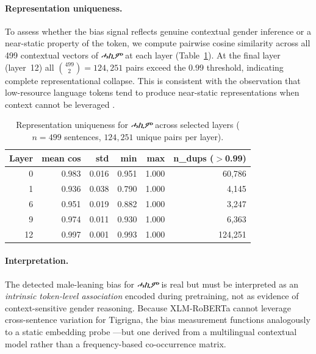 \documentclass[10pt]{article}
\begin{document}
\paragraph{Representation uniqueness.}
To assess whether the bias signal reflects genuine contextual gender inference
or a near-static property of the token, we compute pairwise cosine similarity
across all 499 contextual vectors of \textit{ሓኪም} at each layer
(Table~\ref{tab:hakim-uniqueness}). At the final layer (layer~12) all
$\binom{499}{2} = 124{,}251$ pairs exceed the $0.99$ threshold, indicating
complete representational collapse. This is consistent with the observation
that low-resource language tokens tend to produce near-static representations
when context cannot be leveraged \citep{bommasani2020reductions}.

\begin{table}[H]
\centering
\caption{Representation uniqueness for \textit{ሓኪም} across selected layers
         ($n = 499$ sentences, $124{,}251$ unique pairs per layer).}
\label{tab:hakim-uniqueness}
\small
\begin{tabular}{rrrrrr}
\toprule
\textbf{Layer} & \textbf{mean cos} & \textbf{std} & \textbf{min} & \textbf{max} & \textbf{n\_dups ($>$0.99)} \\
\midrule
 0 & 0.983 & 0.016 & 0.951 & 1.000 &  60{,}786 \\
 1 & 0.936 & 0.038 & 0.790 & 1.000 &   4{,}145 \\
 6 & 0.951 & 0.019 & 0.882 & 1.000 &   3{,}247 \\
 9 & 0.974 & 0.011 & 0.930 & 1.000 &   6{,}363 \\
12 & 0.997 & 0.001 & 0.993 & 1.000 & 124{,}251 \\
\bottomrule
\end{tabular}
\end{table}

\paragraph{Interpretation.}
The detected male-leaning bias for \textit{ሓኪም} is real but must be
interpreted as an \emph{intrinsic token-level association} encoded during
pretraining, not as evidence of context-sensitive gender reasoning. Because
XLM-RoBERTa cannot leverage cross-sentence variation for Tigrigna, the bias
measurement functions analogously to a static embedding probe
\citep{caliskan2017semantics}---but one derived from a multilingual contextual
model rather than a frequency-based co-occurrence matrix.
\end{document}
